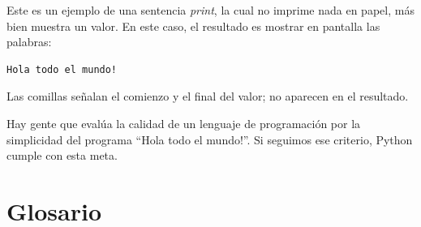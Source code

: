 Este es un ejemplo de una sentencia {\em print}, la cual no
imprime nada en papel, más bien muestra un valor. En este caso,
el resultado es mostrar en pantalla las palabras:

\beforeverb
\begin{verbatim}
Hola todo el mundo!
\end{verbatim}
\afterverb
%
Las comillas señalan el comienzo y el final del valor; no
aparecen en el resultado.


Hay gente que evalúa la calidad de un lenguaje de programación por
la simplicidad del programa ``Hola todo el mundo!''. Si seguimos
ese criterio, Python cumple con esta meta.

\section{Glosario}

